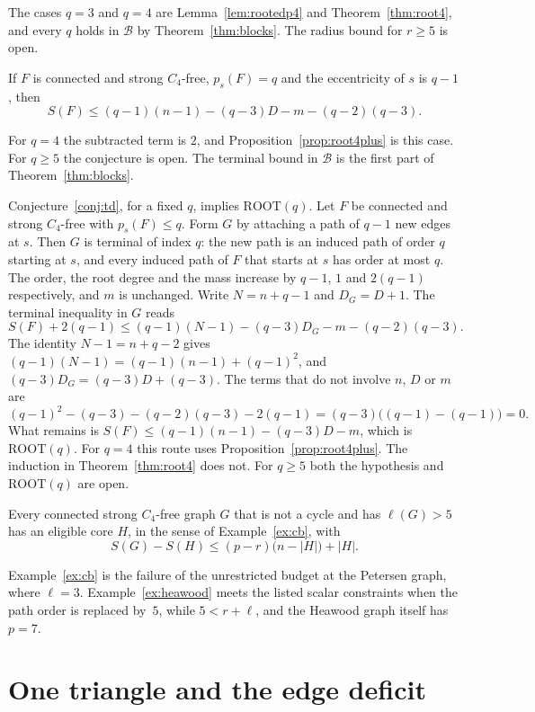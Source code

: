 \documentclass[ASNA]{USG}
\theoremstyle{WBstyletwo}
\numberwithin{equation}{section}
\newcommand{\lr}{\ell}
\newcommand{\pp}{p}
\newcommand{\ROOT}{\mathrm{ROOT}}
\begin{document}
The cases $q=3$ and $q=4$ are Lemma~\ref{lem:rootedp4} and Theorem~\ref{thm:root4}, and every $q$ holds in $\mathcal B$ by Theorem~\ref{thm:blocks}. The radius bound for $r\ge 5$ is open.

\begin{conjecture}\label{conj:td}
If $F$ is connected and strong $C_4$-free, $\pp_s(F)=q$ and the eccentricity of $s$ is $q-1$, then
\[
S(F)\le(q-1)(n-1)-(q-3)D-m-(q-2)(q-3).
\]
\end{conjecture}

For $q=4$ the subtracted term is $2$, and Proposition~\ref{prop:root4plus} is this case. For $q\ge 5$ the conjecture is open. The terminal bound in $\mathcal B$ is the first part of Theorem~\ref{thm:blocks}.

Conjecture~\ref{conj:td}, for a fixed $q$, implies $\ROOT(q)$. Let $F$ be connected and strong $C_4$-free with $\pp_s(F)\le q$. Form $G$ by attaching a path of $q-1$ new edges at $s$. Then $G$ is terminal of index $q$: the new path is an induced path of order $q$ starting at $s$, and every induced path of $F$ that starts at $s$ has order at most $q$. The order, the root degree and the mass increase by $q-1$, $1$ and $2(q-1)$ respectively, and $m$ is unchanged. Write $N=n+q-1$ and $D_G=D+1$. The terminal inequality in $G$ reads
\[
S(F)+2(q-1)\le(q-1)(N-1)-(q-3)D_G-m-(q-2)(q-3).
\]
The identity $N-1=n+q-2$ gives $(q-1)(N-1)=(q-1)(n-1)+(q-1)^2$, and $(q-3)D_G=(q-3)D+(q-3)$. The terms that do not involve $n$, $D$ or $m$ are
\[
(q-1)^2-(q-3)-(q-2)(q-3)-2(q-1)=(q-3)\bigl((q-1)-(q-1)\bigr)=0.
\]
What remains is $S(F)\le(q-1)(n-1)-(q-3)D-m$, which is $\ROOT(q)$. For $q=4$ this route uses Proposition~\ref{prop:root4plus}. The induction in Theorem~\ref{thm:root4} does not. For $q\ge 5$ both the hypothesis and $\ROOT(q)$ are open.

\begin{conjecture}\label{conj:cbhigh}
Every connected strong $C_4$-free graph $G$ that is not a cycle and has $\lr(G)>5$ has an eligible core $H$, in the sense of Example~\ref{ex:cb}, with
\[
S(G)-S(H)\le(\pp-r)\bigl(n-|H|\bigr)+|H|.
\]
\end{conjecture}

Example~\ref{ex:cb} is the failure of the unrestricted budget at the Petersen graph, where $\lr=3$. Example~\ref{ex:heawood} meets the listed scalar constraints when the path order is replaced by~$5$, while $5<r+\lr$, and the Heawood graph itself has $\pp=7$.

\section{One triangle and the edge deficit}\label{sec:edges}
\end{document}
